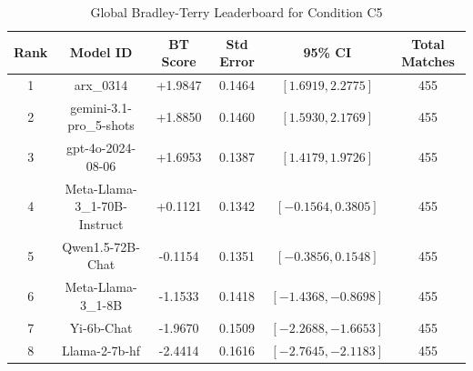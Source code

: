 \begin{table}[ht]
\centering
\caption{Global Bradley-Terry Leaderboard for Condition \textsc{C5}}
\label{tab:leaderboard_c5}
\begin{tabular}{cccccc}
\hline
\textbf{Rank} & \textbf{Model ID} & \textbf{BT Score} & \textbf{Std Error} & \textbf{95\% CI} & \textbf{Total Matches} \\
\hline
1 & arx\_0314 & +1.9847 & 0.1464 & $[1.6919, 2.2775]$ & 455 \\
2 & gemini-3.1-pro\_5-shots & +1.8850 & 0.1460 & $[1.5930, 2.1769]$ & 455 \\
3 & gpt-4o-2024-08-06 & +1.6953 & 0.1387 & $[1.4179, 1.9726]$ & 455 \\
4 & Meta-Llama-3\_1-70B-Instruct & +0.1121 & 0.1342 & $[-0.1564, 0.3805]$ & 455 \\
5 & Qwen1.5-72B-Chat & -0.1154 & 0.1351 & $[-0.3856, 0.1548]$ & 455 \\
6 & Meta-Llama-3\_1-8B & -1.1533 & 0.1418 & $[-1.4368, -0.8698]$ & 455 \\
7 & Yi-6b-Chat & -1.9670 & 0.1509 & $[-2.2688, -1.6653]$ & 455 \\
8 & Llama-2-7b-hf & -2.4414 & 0.1616 & $[-2.7645, -2.1183]$ & 455 \\
\hline
\end{tabular}
\end{table}
